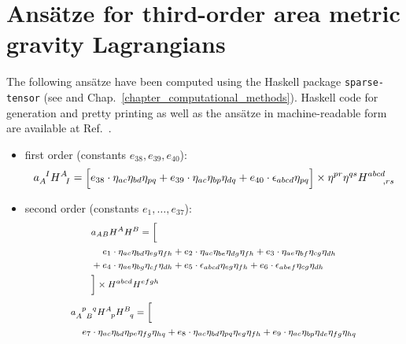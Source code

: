 \chapter{Ansätze for third-order area metric gravity Lagrangians}
\label{appendix_ansaetze}

The following ansätze have been computed using the Haskell package \texttt{sparse-tensor} (see \cite{Reinhart_2019_sparse-tensor} and Chap.~\ref{chapter_computational_methods}). Haskell code for generation and pretty printing as well as the ansätze in machine-readable form are available at Ref.\ \cite{Alex_2020_area-metric-gravity}.

\begin{itemize}
  \item first order (constants $e_{38},e_{39},e_{40}$):
\begin{equation}
  \footnotesize
    a_A^{\hphantom AI} H^A_{\hphantom AI} = \Big\lbrack e_{38} \cdot \eta_{ac}\eta_{bd} \eta_{pq} + e_{39} \cdot \eta_{ac} \eta_{bp} \eta_{dq} + e_{40} \cdot \epsilon_{abcd}\eta_{pq}\Big\rbrack \times \eta^{pr} \eta^{qs} H^{abcd}_{\hphantom{abcd},rs}
\end{equation}
\item second order (constants $e_{1},\dots,e_{37}$):
\begin{equation}
  \footnotesize
  \begin{aligned}
    & a_{AB} H^A H^B = \Big\lbrack \\
    & \hphantom{{}+{}} e_{1} \cdot \eta_{a c} \eta_{b d} \eta_{e g} \eta_{f h} + e_{2} \cdot \eta_{a c} \eta_{b e} \eta_{d g} \eta_{f h} + e_{3} \cdot \eta_{a e} \eta_{b f} \eta_{c g} \eta_{d h} \\
    & + e_{4} \cdot \eta_{a e} \eta_{b g} \eta_{c f} \eta_{d h} + e_{5} \cdot \epsilon_{a b c d} \eta_{e g} \eta_{f h} + e_{6} \cdot \epsilon_{a b e f} \eta_{c g} \eta_{d h} \\
    & \Big\rbrack \times H^{abcd} H^{efgh}
  \end{aligned}
\end{equation}
\begin{equation}
  \footnotesize
  \begin{aligned}
    & a_{A\hphantom{p}B}^{\hphantom Ap\hphantom Bq} H^A_{\hphantom Ap} H^B_{\hphantom Bq} = \Big\lbrack \\
    & \hphantom{{}+{}} e_{7} \cdot \eta_{a c} \eta_{b d} \eta_{p e} \eta_{f g} \eta_{h q} + e_{8} \cdot \eta_{a c} \eta_{b d} \eta_{p q} \eta_{e g} \eta_{f h} + e_{9} \cdot \eta_{a c} \eta_{b p} \eta_{d e} \eta_{f g} \eta_{h q} \\

\end{aligned}
\end{equation}
\end{itemize}
